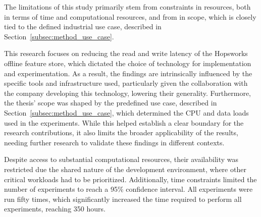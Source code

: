 The limitations of this study primarily stem from constraints in resources, both in terms of time and computational resources, and from in scope, which is closely tied to the defined industrial use case, described in Section~\ref{subsec:method_use_case}.

This research focuses on reducing the read and write latency of the Hopsworks offline feature store, which dictated the choice of technology for implementation and experimentation. As a result, the findings are intrinsically influenced by the specific tools and infrastructure used, particularly given the collaboration with the company developing this technology, lowering their generality. Furthermore, the thesis' scope was shaped by the predefined use case, described in Section~\ref{subsec:method_use_case}, which determined the \gls{CPU} and data loads used in the experiments. While this helped establish a clear boundary for the research contributions, it also limits the broader applicability of the results, needing further research to validate these findings in different contexts.

Despite access to substantial computational resources, their availability was restricted due the shared nature of the development environment, where other critical workloads had to be prioritized. Additionally, time constraints limited the number of experiments to reach a 95\% confidence interval. All experiments were run fifty times, which significantly increased the time required to perform all experiments, reaching 350 hours.
